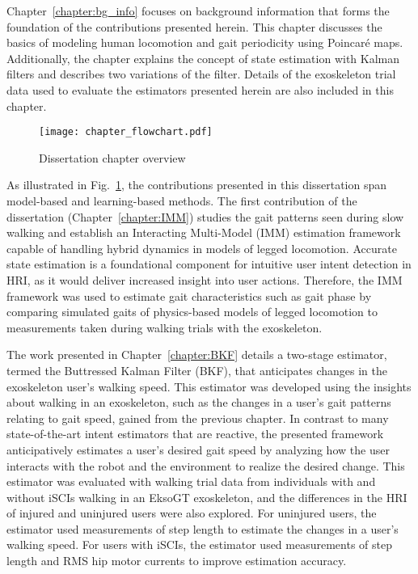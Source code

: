 Chapter~\ref{chapter:bg_info} focuses on background information that forms the foundation of the contributions presented herein. This chapter discusses the basics of modeling human locomotion and gait periodicity using Poincar\'e maps. Additionally, the chapter explains the concept of state estimation with Kalman filters and describes two variations of the filter. Details of the exoskeleton trial data used to evaluate the estimators presented herein are also included in this chapter.

\begin{figure}
	\centering
	\texttt{[image: chapter\_flowchart.pdf]}
	\caption{Dissertation chapter overview \label{fig:chapter_flowchart}}
\end{figure}

As illustrated in Fig.~\ref{fig:chapter_flowchart}, the contributions presented in this dissertation span model-based and learning-based methods. The first contribution of the dissertation (Chapter~\ref{chapter:IMM}) studies the gait patterns seen during slow walking and establish an Interacting Multi-Model (IMM) estimation framework capable of handling hybrid dynamics in models of legged locomotion. Accurate state estimation is a foundational component for intuitive user intent detection in HRI, as it would deliver increased insight into user actions. Therefore, the IMM framework was used to estimate gait characteristics such as gait phase by comparing simulated gaits of physics-based models of legged locomotion to measurements taken during walking trials with the exoskeleton. 

The work presented in Chapter~\ref{chapter:BKF} details a two-stage estimator, termed the Buttressed Kalman Filter (BKF), that anticipates changes in the exoskeleton user’s walking speed. This estimator was developed using the insights about walking in an exoskeleton, such as the changes in a user's gait patterns relating to gait speed, gained from the previous chapter. In contrast to many state-of-the-art intent estimators that are reactive, the presented framework anticipatively estimates a user's desired gait speed by analyzing how the user interacts with the robot and the environment to realize the desired change. This estimator was evaluated with walking trial data from individuals with and without iSCIs walking in an EksoGT exoskeleton, and the differences in the HRI of injured and uninjured users were also explored. For uninjured users, the estimator used measurements of step length to estimate the changes in a user's walking speed. For users with iSCIs, the estimator used measurements of step length and RMS hip motor currents to improve estimation accuracy.

